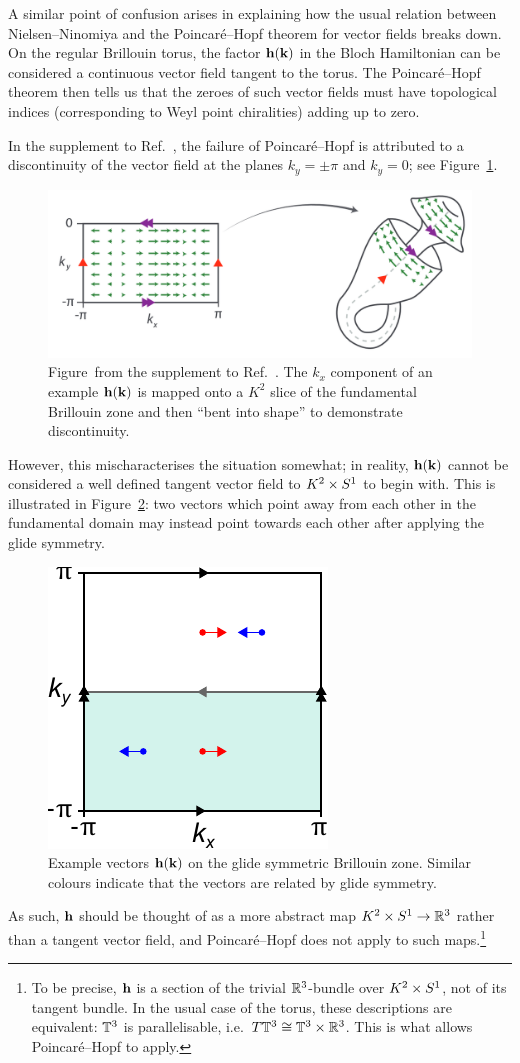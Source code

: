 A similar point of confusion arises in explaining how the usual relation between Nielsen--Ninomiya and the Poincaré--Hopf theorem for vector fields breaks down. On the regular Brillouin torus, the factor $\vb{h}(\vb{k})$ in the Bloch Hamiltonian can be considered a continuous vector field tangent to the torus. The Poincaré--Hopf theorem then tells us that the zeroes of such vector fields must have topological indices (corresponding to Weyl point chiralities) adding up to zero.

In the supplement to Ref.~\cite{Fonseca-Vaidya_nonorientable}, the failure of Poincaré--Hopf is attributed to a discontinuity of the vector field at the planes $k_y=\pm\pi$ and $k_y=0$; see Figure~\ref{fig:Klein-discontinuity}.
\begin{figure}[htb!]
	\centering
	\includegraphics[width=.8\linewidth]{Images/Klein-discontinuity}
	\caption{Figure~from the supplement to Ref.~\cite{Fonseca-Vaidya_nonorientable}. The $k_x$ component of an example $\vb{h}(\vb{k})$ is mapped onto a $K^2$ slice of the fundamental Brillouin zone and then ``bent into shape'' to demonstrate discontinuity.
	}
	\label{fig:Klein-discontinuity}
\end{figure}
However, this mischaracterises the situation somewhat; in reality, $\vb{h}(\vb{k})$ cannot be considered a well defined tangent vector field to $K^2\times S^1$ to begin with. This is illustrated in Figure~\ref{fig:BZ_vectors}: two vectors which point away from each other in the fundamental domain may instead point towards each other after applying the glide symmetry.
\begin{figure}[htb!]
	\centering
	\includegraphics[width=.3\linewidth]{Images/BZ_vectors}
	\caption{Example vectors $\vb{h}(\vb{k})$ on the glide symmetric Brillouin zone. Similar colours indicate that the vectors are related by glide symmetry.}
	\label{fig:BZ_vectors}
\end{figure}
As such, $\vb{h}$ should be thought of as a more abstract map $K^2\times S^1\to\mathbb{R}^3$ rather than a tangent vector field, and Poincaré--Hopf does not apply to such maps.\footnote{
	To be precise, $\vb{h}$ is a section of the trivial $\mathbb{R}^3$-bundle over $K^2\times S^1$, not of its tangent bundle. In the usual case of the torus, these descriptions are equivalent: $\mathbb{T}^3$ is parallelisable, i.e.\ $T\mathbb{T}^3\cong \mathbb{T}^3\times\mathbb{R}^3$. This is what allows Poincaré--Hopf to apply.}

